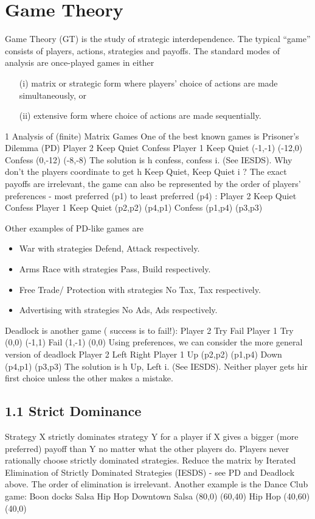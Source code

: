 \section{Game Theory}
Game Theory (GT) is the study of strategic interdependence. The typical “game” consists
of players, actions, strategies and payoffs. The standard modes of analysis are once-played
games in either
\begin{itemize}
\item[(i)] matrix or strategic form where players’ choice of actions are made simultaneously,
or
\item[(ii)] extensive form where choice of actions are made sequentially.
\end{itemize}
1 Analysis of (finite) Matrix Games
One of the best known games is
Prisoner’s Dilemma (PD)
Player 2
Keep Quiet Confess
Player 1 Keep Quiet (-1,-1) (-12,0)
Confess (0,-12) (-8,-8)
The solution is h confess, confess i. (See IESDS).
Why don’t the players coordinate to get h Keep Quiet, Keep Quiet i ?
The exact payoffs are irrelevant, the game can also be represented by the order of players’
preferences - most preferred (p1) to least preferred (p4) :
Player 2
Keep Quiet Confess
Player 1 Keep Quiet (p2,p2) (p4,p1)
Confess (p1,p4) (p3,p3)

Other examples of PD-like games are

\begin{itemize}
\item War with strategies Defend, Attack respectively.
\item Arms Race with strategies Pass, Build respectively.
\item Free Trade/ Protection with strategies No Tax, Tax respectively.
\item Advertising with strategies No Ads, Ads respectively.
\end{itemize}

Deadlock is another game ( success is to fail!):
Player 2
Try Fail
Player 1 Try (0,0) (-1,1)
Fail (1,-1) (0,0)
Using preferences, we can consider the more general version of deadlock
Player 2
Left Right
Player 1 Up (p2,p2) (p1,p4)
Down (p4,p1) (p3,p3)
The solution is h Up, Left i. (See IESDS). Neither player gets hir first choice unless the
other makes a mistake.

\subsection{1.1 Strict Dominance}
Strategy X strictly dominates strategy Y for a player if X gives a bigger (more preferred)
payoff than Y no matter what the other players do. Players never rationally choose strictly
dominated strategies.
Reduce the matrix by Iterated Elimination of Strictly Dominated Strategies
(IESDS) - see PD and Deadlock above. The order of elimination is irrelevant. Another
example is the Dance Club game:
Boon docks
Salsa Hip Hop
Downtown Salsa (80,0) (60,40)
Hip Hop (40,60) (40,0)

